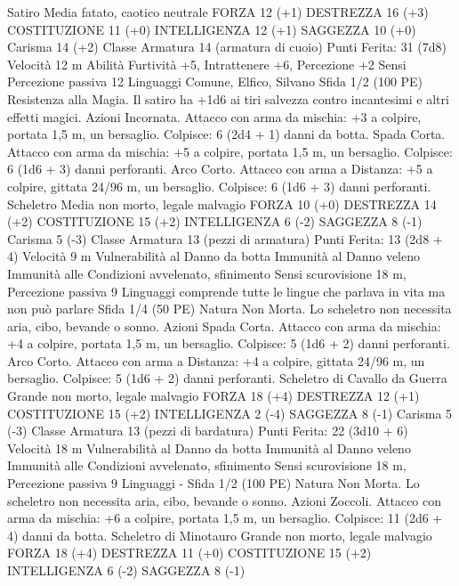 \begin{multicols}{2}
Satiro
Media fatato, caotico neutrale
FORZA 12 (+1)
DESTREZZA 16 (+3)
COSTITUZIONE 11 (+0)
INTELLIGENZA 12 (+1)
SAGGEZZA 10 (+0)
Carisma 14 (+2)
Classe Armatura 14 (armatura di cuoio)
\hspace*{0pt}\hfill{Punti Ferita}: 31 (7d8)
Velocità 12 m
Abilità Furtività +5, Intrattenere +6, Percezione +2
Sensi Percezione passiva 12
Linguaggi Comune, Elfico, Silvano
Sfida 1/2 (100 PE)
Resistenza alla Magia. Il satiro ha +1d6 ai tiri salvezza
contro incantesimi e altri effetti magici.
Azioni
Incornata. Attacco con arma da mischia: +3 a colpire, portata
1,5 m, un bersaglio.
Colpisce: 6 (2d4 + 1) danni da botta.
Spada Corta. Attacco con arma da mischia: +5 a colpire, portata
1,5 m, un bersaglio.
Colpisce: 6 (1d6 + 3) danni perforanti.
Arco Corto. Attacco con arma a Distanza: +5 a colpire, gittata
24/96 m, un bersaglio.
Colpisce: 6 (1d6 + 3) danni perforanti.
Scheletro
Media non morto, legale malvagio
FORZA 10 (+0)
DESTREZZA 14 (+2)
COSTITUZIONE 15 (+2)
INTELLIGENZA 6 (-2)
SAGGEZZA 8 (-1)
Carisma 5 (-3)
Classe Armatura 13 (pezzi di armatura)
\hspace*{0pt}\hfill{Punti Ferita}: 13 (2d8 + 4)
Velocità 9 m
Vulnerabilità al Danno da botta
Immunità al Danno veleno
Immunità alle Condizioni avvelenato, sfinimento
Sensi scurovisione 18 m, Percezione passiva 9
Linguaggi comprende tutte le lingue che parlava in vita ma non
può parlare
Sfida 1/4 (50 PE)
Natura Non Morta. Lo scheletro non necessita aria, cibo,
bevande o sonno.
Azioni
Spada Corta. Attacco con arma da mischia: +4 a colpire, portata
1,5 m, un bersaglio.
Colpisce: 5 (1d6 + 2) danni perforanti.
Arco Corto. Attacco con arma a Distanza: +4 a colpire, gittata
24/96 m, un bersaglio.
Colpisce: 5 (1d6 + 2) danni perforanti.
Scheletro di Cavallo da Guerra
Grande non morto, legale malvagio
FORZA 18 (+4)
DESTREZZA 12 (+1)
COSTITUZIONE 15 (+2)
INTELLIGENZA 2 (-4)
SAGGEZZA 8 (-1)
Carisma 5 (-3)
Classe Armatura 13 (pezzi di bardatura)
\hspace*{0pt}\hfill{Punti Ferita}: 22 (3d10 + 6)
Velocità 18 m
Vulnerabilità al Danno da botta
Immunità al Danno veleno
Immunità alle Condizioni avvelenato, sfinimento
Sensi scurovisione 18 m, Percezione passiva 9
Linguaggi -
Sfida 1/2 (100 PE)
Natura Non Morta. Lo scheletro non necessita aria, cibo,
bevande o sonno.
Azioni
Zoccoli. Attacco con arma da mischia: +6 a colpire, portata 1,5
m, un bersaglio.
Colpisce: 11 (2d6 + 4) danni da botta.
Scheletro di Minotauro
Grande non morto, legale malvagio
FORZA 18 (+4)
DESTREZZA 11 (+0)
COSTITUZIONE 15 (+2)
INTELLIGENZA 6 (-2)
SAGGEZZA 8 (-1)

\end{multicols}
